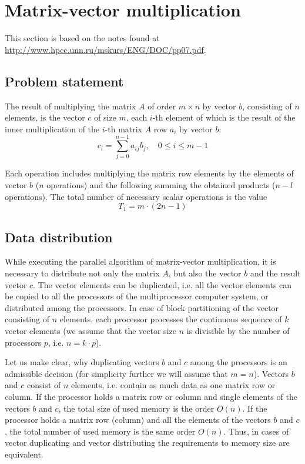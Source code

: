 
\section{Matrix-vector multiplication} %
\label{sec:matrix_multiplication}

This section is based on the notes found at \url{http://www.hpcc.unn.ru/mskurs/ENG/DOC/pp07.pdf}.

\subsection{Problem statement} %
\label{sub:problem_statement}
The result of multiplying the matrix $A$ of order $m\times n$ by vector $b$, consisting of $n$ elements, is the vector $c$ of size $m$, each $i$-th element of which is the result of the inner multiplication of the $i$-th matrix $A$ row $a_i$ by vector $b$:
\begin{equation}
  c_i = \sum_{j=0}^{n-1} a_{ij}b_j, \quad 0\leq i \leq m-1
\end{equation}

Each operation includes multiplying the matrix row elements by the elements of vector $b$ ($n$ operations) and the following summing the obtained products ($n-l$ operations). The total number of necessary scalar operations is the value
\begin{equation}
  T_1 = m \cdot (2n-1)
\end{equation}

\subsection{Data distribution} %
\label{sub:data_distribution}
While executing the parallel algorithm of matrix-vector multiplication, it is necessary to distribute not only the matrix $A$, but also the vector $b$ and the result vector $c$. The vector elements can be duplicated, i.e. all the vector elements can be copied to all the processors of the multiprocessor computer system, or distributed among the processors. In case of block partitioning of the vector consisting of $n$ elements, each processor processes the continuous sequence of $k$ vector elements (we assume that the vector size $n$ is divisible by the number of processors $p$, i.e. $n = k·p$).

Let us make clear, why duplicating vectors $b$ and $c$ among the processors is an admissible decision (for simplicity further we will assume that $m=n$). Vectors $b$ and $c$ consist of $n$ elements, i.e. contain as much data as one matrix row or column. If the processor holds a matrix row or column and single elements of the vectors $b$ and $c$, the total size of used memory is the order $O(n)$. If the processor holds a matrix row (column) and all the elements of the vectors $b$ and $c$, the total number of used memory is the same order $O(n)$. Thus, in cases of vector duplicating and vector distributing the requirements to memory size are equivalent.

